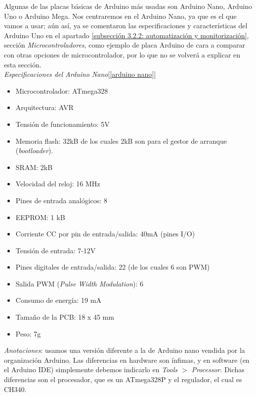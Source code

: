 \documentclass[12pt]{article}
\begin{document}
	\noindent Algunas de las placas básicas de Arduino más usadas son Arduino Nano, Arduino Uno o Arduino Mega. Nos centraremos en el Arduino Nano, ya que es el que vamos a usar; aún así, ya se comentaron las especificaciones y características del Arduino Uno en el apartado \ref{subsección 3.2.2: automatización y monitorización}, sección \textit{Microcontroladores}, como ejemplo de placa Arduino de cara a comparar con otras opciones de microcontrolador, por lo que no se volverá a explicar en esta sección.  \\
	
	\noindent \textit{Especificaciones del Arduino Nano}[\ref{arduino nano}] \\
	
	\begin{itemize}
		\item Microcontrolador: ATmega328
		\item Arquitectura: AVR
		\item Tensión de funcionamiento: 5V
		\item Memoria flash: 32kB de los cuales 2kB son para el gestor de arranque (\textit{bootloader}).
		\item SRAM: 2kB
		\item Velocidad del reloj: 16 MHz
		\item Pines de entrada analógicos: 8
		\item EEPROM: 1 kB
		\item Corriente CC por pin de entrada/salida: 40mA (pines I/O)
		\item Tensión de entrada: 7-12V
		\item Pines digitales de entrada/salida: 22 (de los cuales 6 son PWM)
		\item Salida PWM (\textit{Pulse Width Modulation}): 6
		\item Consumo de energía: 19 mA
		\item Tamaño de la PCB: 18 x 45 mm
		\item Peso: 7g
	\end{itemize}
	
	\noindent \textit{Anotaciones}: usamos una versión diferente a la de Arduino nano vendida por la organización Arduino. Las diferencias en hardware son ínfimas, y en software (en el Arduino IDE) simplemente debemos indicarlo en \textit{Tools $>$ Processor}. Dichas diferencias son el procesador, que es un ATmega328P y el regulador, el cual es CH340.\\
	
\end{document}

